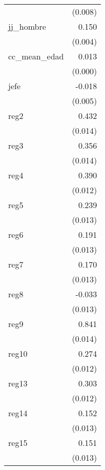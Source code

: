 {\begin{longtable}{l*{1}{D{.}{.}{-1}}}
            &     (0.008)         \\
\addlinespace
jj\_hombre   &       0.150\sym{***}\\
            &     (0.004)         \\
\addlinespace
cc\_mean\_edad&       0.013\sym{***}\\
            &     (0.000)         \\
\addlinespace
jefe        &      -0.018\sym{***}\\
            &     (0.005)         \\
\addlinespace
reg2        &       0.432\sym{***}\\
            &     (0.014)         \\
\addlinespace
reg3        &       0.356\sym{***}\\
            &     (0.014)         \\
\addlinespace
reg4        &       0.390\sym{***}\\
            &     (0.012)         \\
\addlinespace
reg5        &       0.239\sym{***}\\
            &     (0.013)         \\
\addlinespace
reg6        &       0.191\sym{***}\\
            &     (0.013)         \\
\addlinespace
reg7        &       0.170\sym{***}\\
            &     (0.013)         \\
\addlinespace
reg8        &      -0.033\sym{**} \\
            &     (0.013)         \\
\addlinespace
reg9        &       0.841\sym{***}\\
            &     (0.014)         \\
\addlinespace
reg10       &       0.274\sym{***}\\
            &     (0.012)         \\
\addlinespace
reg13       &       0.303\sym{***}\\
            &     (0.012)         \\
\addlinespace
reg14       &       0.152\sym{***}\\
            &     (0.013)         \\
\addlinespace
reg15       &       0.151\sym{***}\\
            &     (0.013)         \\

\end{longtable}}
